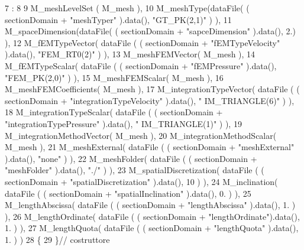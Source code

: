 \begin{DoxyCode}
7                                                                                  :
8 
9             M\_meshLevelSet ( M\_mesh ),
10             M\_meshType(dataFile( ( sectionDomain + \textcolor{stringliteral}{"meshTyper"} ).data(), \textcolor{stringliteral}{"GT\_PK(2,1)"} ) ),
11             M\_spaceDimension(dataFile( ( sectionDomain + \textcolor{stringliteral}{"sapceDimension"} ).data(), 2.) ),
12             M\_fEMTypeVector( dataFile ( ( sectionDomain + \textcolor{stringliteral}{"fEMTypeVelocity"} ).data(), \textcolor{stringliteral}{"FEM\_RT0(2)"} ) ),
13             M\_meshFEMVector( M\_mesh ),
14             M\_fEMTypeScalar( dataFile ( ( sectionDomain + \textcolor{stringliteral}{"fEMPressure"} ).data(), \textcolor{stringliteral}{"FEM\_PK(2,0)"} ) ),
15             M\_meshFEMScalar( M\_mesh ),
16             M\_meshFEMCoefficients( M\_mesh ),
17             M\_integrationTypeVector( dataFile ( ( sectionDomain + \textcolor{stringliteral}{"integrationTypeVelocity"} ).data(), \textcolor{stringliteral}{"
      IM\_TRIANGLE(6)"} ) ),
18             M\_integrationTypeScalar( dataFile ( ( sectionDomain + \textcolor{stringliteral}{"integrationTypePressure"} ).data(), \textcolor{stringliteral}{"
      IM\_TRIANGLE(1)"} ) ),
19             M\_integrationMethodVector( M\_mesh ),
20             M\_integrationMethodScalar( M\_mesh ),
21             M\_meshExternal( dataFile ( ( sectionDomain + \textcolor{stringliteral}{"meshExternal"} ).data(), \textcolor{stringliteral}{"none"} ) ),
22             M\_meshFolder( dataFile ( ( sectionDomain + \textcolor{stringliteral}{"meshFolder"} ).data(), \textcolor{stringliteral}{"./"} ) ),
23             M\_spatialDiscretization( dataFile ( ( sectionDomain + \textcolor{stringliteral}{"spatialDiscretization"} ).data(), 10 ) ),
24             M\_inclination( dataFile ( ( sectionDomain + \textcolor{stringliteral}{"spatialInclination"} ).data(), 0. ) ),
25             M\_lengthAbscissa( dataFile ( ( sectionDomain + \textcolor{stringliteral}{"lengthAbscissa"} ).data(), 1. ) ),
26             M\_lengthOrdinate( dataFile ( ( sectionDomain + \textcolor{stringliteral}{"lengthOrdinate"}).data(), 1. ) ),
27             M\_lengthQuota( dataFile ( ( sectionDomain + \textcolor{stringliteral}{"lengthQuota"} ).data(), 1. ) )
28 \{
29 \}\textcolor{comment}{// costruttore}
\end{DoxyCode}


